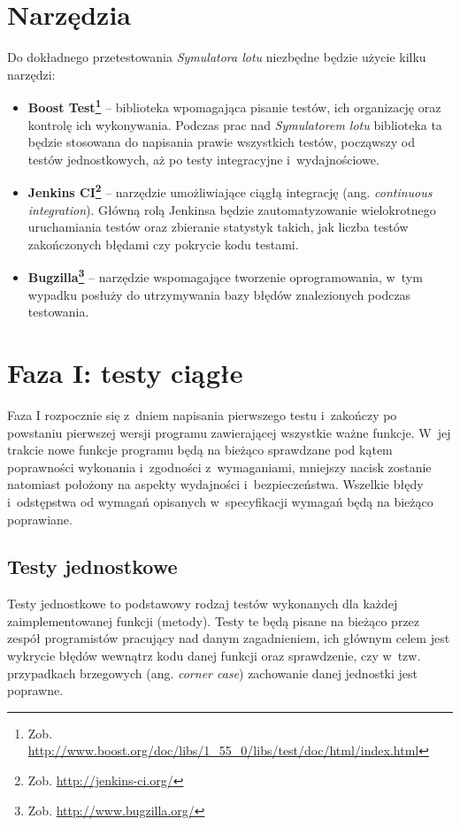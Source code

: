 \documentclass{mwrep}
\begin{document}
\chapter{Narzędzia}
Do dokładnego przetestowania \textit{Symulatora lotu} niezbędne będzie użycie kilku narzędzi:
\begin{itemize}
\item \textbf{Boost Test\footnote{Zob. \url{http://www.boost.org/doc/libs/1\_55\_0/libs/test/doc/html/index.html}}} -- biblioteka  wpomagająca pisanie testów, ich organizację oraz kontrolę ich wykonywania. Podczas prac nad \textit{Symulatorem lotu} biblioteka ta będzie stosowana do napisania prawie wszystkich testów, począwszy od testów jednostkowych, aż po testy integracyjne i~wydajnościowe.
\item \textbf{Jenkins CI\footnote{Zob. \url{http://jenkins-ci.org/}}} -- narzędzie umożliwiające ciągłą integrację (ang. \textit{continuous integration}). Główną rolą Jenkinsa będzie zautomatyzowanie wielokrotnego uruchamiania testów oraz zbieranie statystyk takich, jak liczba testów zakończonych błędami czy pokrycie kodu testami.
\item \textbf{Bugzilla\footnote{Zob. \url{http://www.bugzilla.org/}}} -- narzędzie wspomagające tworzenie oprogramowania, \linebreak w~tym wypadku posłuży do utrzymywania bazy błędów znalezionych podczas testowania.
\end{itemize}

\chapter{Faza I: testy ciągłe}
Faza I rozpocznie się z~dniem napisania pierwszego testu i~zakończy po powstaniu pierwszej wersji programu zawierającej wszystkie ważne funkcje. W~jej trakcie nowe funkcje programu będą na bieżąco sprawdzane pod kątem poprawności wykonania i~zgodności z~wymaganiami, mniejszy nacisk zostanie natomiast położony na aspekty wydajności i~bezpieczeństwa. Wszelkie błędy i~odstępstwa od wymagań opisanych w~specyfikacji wymagań będą na bieżąco poprawiane.

\section{Testy jednostkowe}
Testy jednostkowe to podstawowy rodzaj testów wykonanych dla każdej zaimplementowanej funkcji (metody). Testy te będą pisane na bieżąco przez zespół programistów pracujący nad danym zagadnieniem, ich głównym celem jest wykrycie błędów wewnątrz kodu danej funkcji oraz sprawdzenie, czy w~tzw. przypadkach brzegowych (ang. \textit{corner case}) zachowanie danej jednostki jest poprawne.
\end{document}
